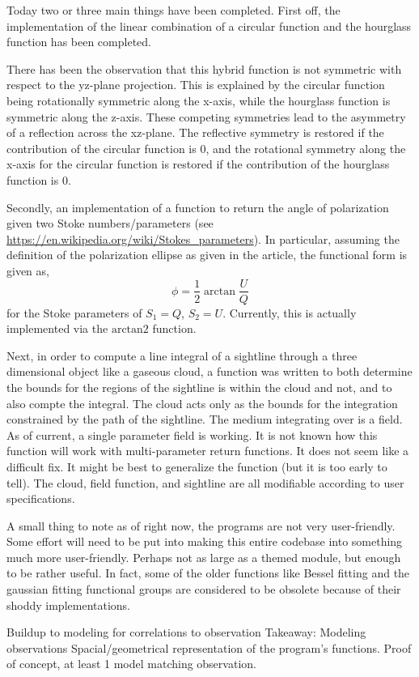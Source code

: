 \documentclass[twocolumn]{article}
\begin{document}
Today two or three main things have been completed. First off, the implementation of the linear combination of a circular function and the hourglass function has been completed.

There has been the observation that this hybrid function is not symmetric with respect to the yz-plane projection. This is explained by the circular function being rotationally symmetric along the x-axis, while the hourglass function is symmetric along the z-axis. These competing symmetries lead to the asymmetry of a reflection across the xz-plane. The reflective symmetry is restored if the contribution of the circular function is $0$, and the rotational symmetry along the x-axis for the circular function is restored if the contribution of the hourglass function is $0$.

Secondly, an implementation of a function to return the angle of polarization given two Stoke numbers/parameters (see \url{https://en.wikipedia.org/wiki/Stokes_parameters}). In particular, assuming the definition of the polarization ellipse as given in the article, the functional form is given as,
\begin{equation}
	\phi = \frac{1}{2} \arctan{\frac{U}{Q}}
\end{equation}
for the Stoke parameters of $S_1 = Q$, $S_2 = U$. Currently, this is actually implemented via the $\text{arctan2}$ function.

Next, in order to compute a line integral of a sightline through a three dimensional object like a gaseous cloud, a function was written to both determine the bounds for the regions of the sightline is within the cloud and not, and to also compte the integral. The cloud acts only as the bounds for the integration constrained by the path of the sightline. The medium integrating over is a field. As of current, a single parameter field is working. It is not known how this function will work with multi-parameter return functions. It does not seem like a difficult fix. It might be best to generalize the function (but it is too early to tell). The cloud, field function, and sightline are all modifiable according to user specifications. 

A small thing to note as of right now, the programs are not very user-friendly. Some effort will need to be put into making this entire codebase into something much more user-friendly. Perhaps not as large as a themed module, but enough to be rather useful. In fact, some of the older functions like Bessel fitting and the gaussian fitting functional groups are considered to be obsolete because of their shoddy implementations.


Buildup to modeling for correlations to observation
Takeaway:
	Modeling observations
	Spacial/geometrical representation of the program's functions.
	Proof of concept, at least 1 model matching observation.



\printbibliography
\end{document}
